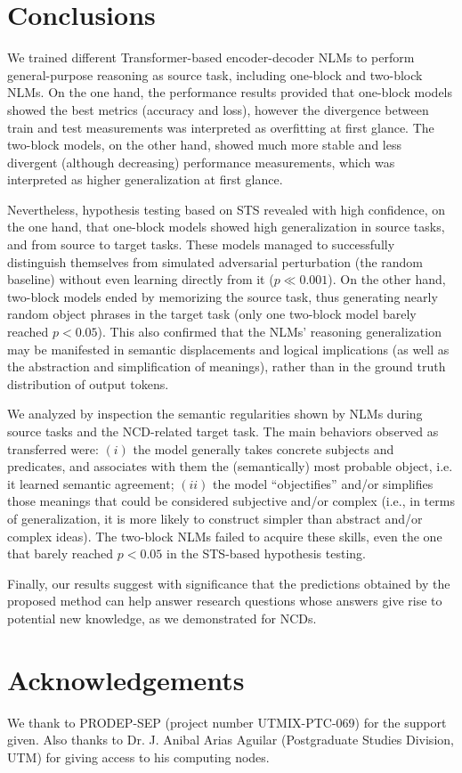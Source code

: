\documentclass[preprint]{elsarticle}
\begin{document}
\section{Conclusions}\label{sec:08_conclusions}

We trained different Transformer-based encoder-decoder NLMs to perform general-purpose reasoning as source task, including one-block and two-block NLMs. On the one hand, the performance results provided that one-block models showed the best metrics (accuracy and loss), however the divergence between train and test measurements was interpreted as overfitting at first glance. The two-block models, on the other hand, showed much more stable and less divergent (although decreasing) performance measurements, which was interpreted as higher generalization at first glance.

Nevertheless, hypothesis testing based on STS revealed with high confidence, on the one hand, that one-block models showed high generalization in source tasks, and from source to target tasks. These models managed to successfully distinguish themselves from simulated adversarial perturbation (the random baseline) without even learning directly from it ($p\ll 0.001$). On the other hand, two-block models ended by memorizing the source task, thus generating nearly random object phrases in the target task (only one two-block model barely reached $p<0.05$). This also confirmed that the NLMs' reasoning generalization may be manifested in semantic displacements and logical implications (as well as the abstraction and simplification of meanings), rather than in the ground truth distribution of output tokens.

We analyzed by inspection the semantic regularities shown by NLMs during source tasks and the NCD-related target task. The main behaviors observed as transferred were: $(i)$ the model generally takes concrete subjects and predicates, and associates with them the (semantically) most probable object, i.e. it learned semantic agreement; $(ii)$ the model ``objectifies'' and/or simplifies those meanings that could be considered subjective and/or complex (i.e., in terms of generalization, it is more likely to construct simpler than abstract and/or complex ideas). The two-block NLMs failed to acquire these skills, even the one that barely reached $p<0.05$ in the STS-based hypothesis testing.

Finally, our results suggest with significance that the predictions obtained by the proposed method can help answer research questions whose answers give rise to potential new knowledge, as we demonstrated for NCDs.

\section*{Acknowledgements}
We thank to PRODEP-SEP (project number UTMIX-PTC-069) for the support given. Also thanks to Dr. J. Anibal Arias Aguilar (Postgraduate Studies Division, UTM) for giving access to his computing nodes.


\end{document}
